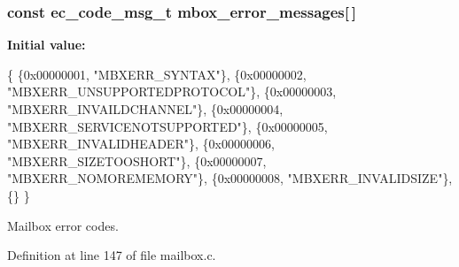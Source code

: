 \subsubsection[{mbox\-\_\-error\-\_\-messages}]{\setlength{\rightskip}{0pt plus 5cm}const {\bf ec\-\_\-code\-\_\-msg\-\_\-t} mbox\-\_\-error\-\_\-messages[$\,$]}\label{mailbox_8c_a38d51351bd6f8415a033c027c5e39a3a}
{\bfseries Initial value\-:}
\begin{DoxyCode}
 \{
    \{0x00000001, \textcolor{stringliteral}{"MBXERR\_SYNTAX"}\},
    \{0x00000002, \textcolor{stringliteral}{"MBXERR\_UNSUPPORTEDPROTOCOL"}\},
    \{0x00000003, \textcolor{stringliteral}{"MBXERR\_INVAILDCHANNEL"}\},
    \{0x00000004, \textcolor{stringliteral}{"MBXERR\_SERVICENOTSUPPORTED"}\},
    \{0x00000005, \textcolor{stringliteral}{"MBXERR\_INVALIDHEADER"}\},
    \{0x00000006, \textcolor{stringliteral}{"MBXERR\_SIZETOOSHORT"}\},
    \{0x00000007, \textcolor{stringliteral}{"MBXERR\_NOMOREMEMORY"}\},
    \{0x00000008, \textcolor{stringliteral}{"MBXERR\_INVALIDSIZE"}\},
    \{\}
\}
\end{DoxyCode}


Mailbox error codes. 



Definition at line 147 of file mailbox.\-c.

